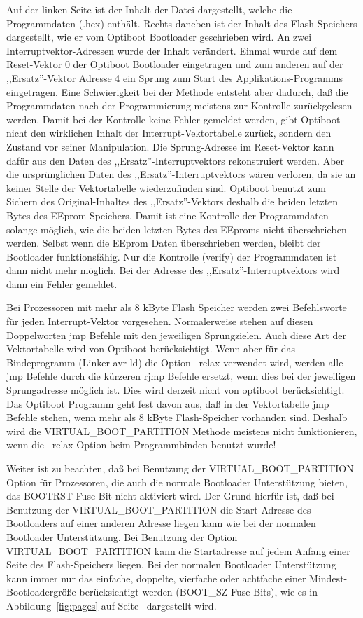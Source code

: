 Auf der linken Seite ist der Inhalt der Datei dargestellt, welche die Programmdaten (.hex) enthält.
Rechts daneben ist der Inhalt des Flash-Speichers dargestellt, wie er vom Optiboot Bootloader
geschrieben wird. An zwei Interruptvektor-Adressen wurde der Inhalt verändert.
Einmal wurde auf dem Reset-Vektor 0 der Optiboot Bootloader eingetragen und zum anderen
auf der ,,Ersatz''-Vektor Adresse 4 ein Sprung zum Start des Applikations-Programms eingetragen. 
Eine Schwierigkeit bei der Methode entsteht aber dadurch, daß die Programmdaten nach
der Programmierung meistens zur Kontrolle zurückgelesen werden.
Damit bei der Kontrolle keine Fehler gemeldet werden, gibt Optiboot nicht den wirklichen Inhalt
der Interrupt-Vektortabelle zurück, sondern den Zustand vor seiner Manipulation.
Die Sprung-Adresse im Reset-Vektor kann dafür aus den Daten des ,,Ersatz''-Interruptvektors rekonstruiert werden.
Aber die ursprünglichen Daten des ,,Ersatz''-Interruptvektors wären verloren, da sie an keiner
Stelle der Vektortabelle wiederzufinden sind.
Optiboot benutzt zum Sichern des Original-Inhaltes des ,,Ersatz''-Vektors deshalb die beiden letzten
Bytes des EEprom-Speichers.
Damit ist eine Kontrolle der Programmdaten solange möglich, wie die beiden letzten Bytes
des EEproms nicht überschrieben werden.
Selbst wenn die EEprom Daten überschrieben werden, bleibt der Bootloader funktionsfähig.
Nur die Kontrolle (verify) der Programmdaten ist dann nicht mehr möglich. Bei der Adresse
des ,,Ersatz''-Interruptvektors wird dann ein Fehler gemeldet.

Bei Prozessoren mit mehr als 8 kByte Flash Speicher werden zwei Befehlsworte für jeden Interrupt-Vektor
vorgesehen. Normalerweise stehen auf diesen Doppelworten jmp Befehle mit den jeweiligen Sprungzielen.
Auch diese Art der Vektortabelle wird von Optiboot berücksichtigt. Wenn aber für das Bindeprogramm
(Linker avr-ld) die Option --relax verwendet wird,
werden alle jmp Befehle durch die kürzeren rjmp Befehle ersetzt,
wenn dies bei der jeweiligen Sprungadresse möglich ist.
Dies wird derzeit nicht von optiboot berücksichtigt.
Das Optiboot Programm geht fest davon aus, daß in der Vektortabelle jmp Befehle stehen,
wenn mehr als 8 kByte Flash-Speicher vorhanden sind.
Deshalb wird die VIRTUAL\_BOOT\_PARTITION Methode meistens nicht funktionieren, wenn die --relax Option
beim Programmbinden benutzt wurde!


Weiter ist zu beachten, daß bei Benutzung der VIRTUAL\_BOOT\_PARTITION Option für Prozessoren, die auch
die normale Bootloader Unterstützung bieten, das BOOTRST Fuse Bit nicht aktiviert wird.
Der Grund hierfür ist, daß bei Benutzung der VIRTUAL\_BOOT\_PARTITION die Start-Adresse des Bootloaders
auf einer anderen Adresse liegen kann wie bei der normalen Bootloader Unterstützung.
Bei Benutzung der Option VIRTUAL\_BOOT\_PARTITION kann die Startadresse auf jedem Anfang einer
Seite des Flash-Speichers liegen. Bei der normalen Bootloader Unterstützung kann immer nur das
einfache, doppelte, vierfache oder achtfache einer Mindest-Bootloadergröße berücksichtigt
werden (BOOT\_SZ Fuse-Bits), wie es in Abbildung~\ref{fig:pages} auf Seite~\pageref{fig:pages}
dargestellt wird.

